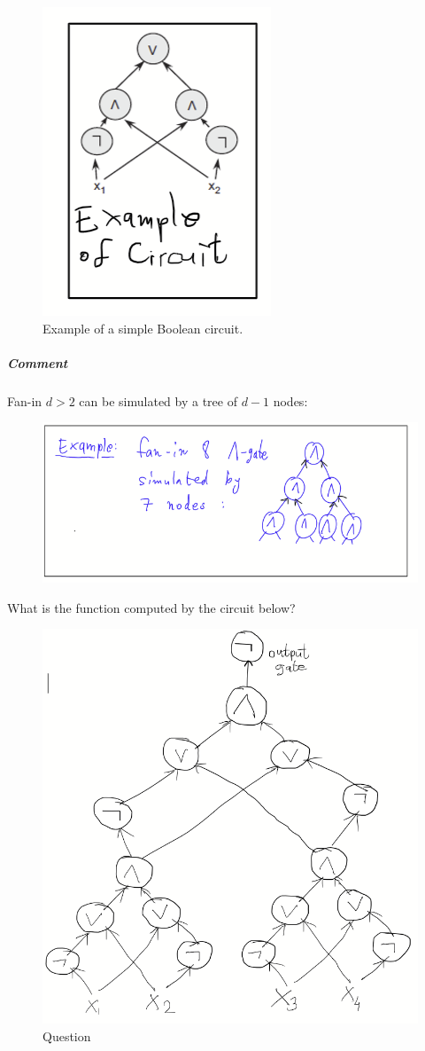 \begin{figure}
\sidecaption
  \includegraphics[width=0.2\linewidth]{images/Example-circuit.png}
    \caption{Example of a simple Boolean circuit.}
    \label{fig:enter-label}
\end{figure}

%

\subparagraph{Comment}
Fan-in $d>2$ 
can be simulated by a tree of $d-1 $ nodes: 
\begin{figure}[h]
    \centering
  \includegraphics[width=0.5\linewidth]{images/Example-tree-circuit.png}
    \label{fig:enter-label}
\end{figure}
 


\newpage 

\begin{question}{What is the function computed by the circuit below?}
\begin{figure}
    \centering
    \includegraphics[width=0.75\linewidth]{images/parity-circuit-question.png}
    \caption{Question}
    \label{fig:enter-label}
\end{figure}
\end{question}

